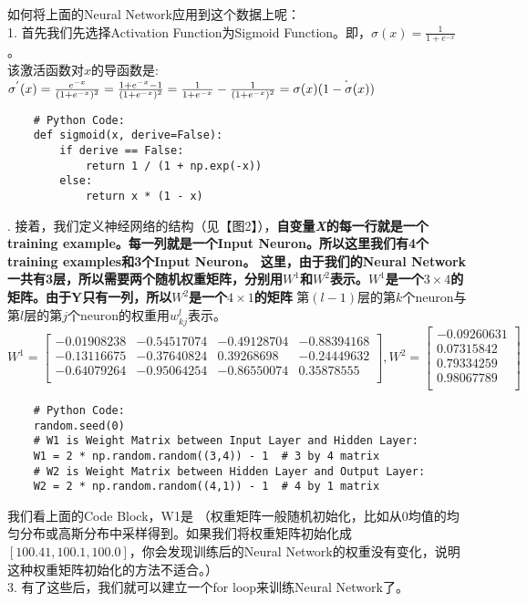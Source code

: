 \documentclass[a4paper,12pt,oneside]{book}
\begin{document}
如何将上面的Neural Network应用到这个数据上呢：\\
1. 首先我们先选择Activation Function为Sigmoid Function。即，$\sigma{(x)}=\frac{1}{1+e^{-x}}$。\\
该激活函数对$x$的导函数是:\\
$\sigma^{'}(x)=\frac{e^{-x}}{(1+e^{-x})^2}\\
=\frac{1+e^{-x}-1}{(1+e^{-x})^2}\\
=\frac{1}{1+e^{-x}}-\frac{1}{(1+e^{-x})^2}\\
=\sigma(x)\dot{(1-\sigma{(x)})}$\\
\noindent
\begin{lstlisting} 
    # Python Code:
    def sigmoid(x, derive=False):
        if derive == False:
            return 1 / (1 + np.exp(-x))
        else:
            return x * (1 - x)
\end{lstlisting}
. 接着，我们定义神经网络的结构（见【图2】），\textbf{自变量\textit{X}的每一行就是一个training example。每一列就是一个Input Neuron。所以这里我们有4个training examples和3个Input Neuron。
这里，由于我们的Neural Network一共有3层，所以需要两个随机权重矩阵，分别用\textit{$W^1$}和\textit{$W^2$}表示。\textit{$W^1$}是一个$3\times4$的矩阵。由于Y只有一列，所以\textit{$W^2$}是一个$4\times1$的矩阵}
第$(l-1)$层的第$k$个neuron与第$l$层的第$j$个neuron的权重用$w^l_{kj}$表示。\\
\begin{equation*}
    W^1 = \begin{bmatrix}
        -0.01908238 & -0.54517074 & -0.49128704 & -0.88394168\\
        -0.13116675 & -0.37640824 & 0.39268698 & -0.24449632\\
        -0.64079264 & -0.95064254 & -0.86550074 & 0.35878555\\
    \end{bmatrix}
    , W^2 = \begin{bmatrix}
        -0.09260631\\
        0.07315842\\
        0.79334259\\
        0.98067789\\
    \end{bmatrix}
\end{equation*}
\begin{lstlisting}
    # Python Code:
    random.seed(0)
    # W1 is Weight Matrix between Input Layer and Hidden Layer:
    W1 = 2 * np.random.random((3,4)) - 1  # 3 by 4 matrix
    # W2 is Weight Matrix between Hidden Layer and Output Layer:
    W2 = 2 * np.random.random((4,1)) - 1  # 4 by 1 matrix
\end{lstlisting}
我们看上面的Code Block，W1是
（权重矩阵一般随机初始化，比如从0均值的均匀分布或高斯分布中采样得到。如果我们将权重矩阵初始化成$[100.41, 100.1, 100.0]$，你会发现训练后的Neural Network的权重没有变化，说明这种权重矩阵初始化的方法不适合。）\\
3. 有了这些后，我们就可以建立一个for loop来训练Neural Network了。
\end{document}
